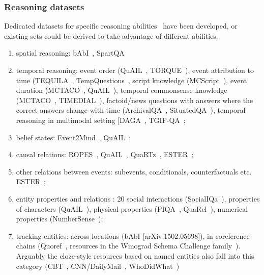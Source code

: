 \documentclass[acmsmall]{acmart}
\begin{document}
\subsubsection{Reasoning datasets}\label{reasoning_dataset}
Dedicated datasets for specific reasoning abilities~\citep{qiaoReasoningLanguageModel2022} have been developed, or existing sets could be derived to take advantage of different abilities.
\begin{enumerate}
    \item spatial reasoning: bAbI~\citep{westonAICompleteQuestionAnswering2015}, SpartQA~\citep{mirzaeeSPARTQATextualQuestion2021}
    \item temporal reasoning: event order (QuAIL~\citep{rogersGettingCloserAI2020}, TORQUE~\citep{ningTORQUEReadingComprehension2020}), 
event attribution to time (TEQUILA~\citep{jiaTEQUILATemporalQuestion2018}, TempQuestions~\citep{jiaTempQuestionsBenchmarkTemporal2018}, 
script knowledge (MCScript~\citep{ostermannMCScriptNovelDataset2018}), event duration (MCTACO~\citep{zhouGoingVacationTakes2019}, QuAIL~\citep{rogersGettingCloserAI2020}), 
temporal commonsense knowledge (MCTACO~\citep{zhouGoingVacationTakes2019}, TIMEDIAL~\citep{qinTIMEDIALTemporalCommonsense2021}), 
factoid/news questions with answers where the correct answers change with time (ArchivalQA~\citep{wangArchivalQALargescaleBenchmark2022}, SituatedQA~\citep{zhangSituatedQAIncorporatingExtraLinguistic2021}), temporal reasoning in multimodal setting [DAGA~\citep{fayekTemporalReasoningAudio2020}, TGIF-QA~\citep{jangTGIFQASpatioTemporalReasoning2017};
    \item belief states: Event2Mind~\citep{rashkinEvent2MindCommonsenseInference2018}, QuAIL~\citep{rogersGettingCloserAI2020};
    \item causal relations: ROPES~\citep{linReasoningParagraphEffects2019}, QuAIL~\citep{rogersGettingCloserAI2020}, QuaRTz~\citep{tafjordQuaRTzOpenDomainDataset2019}, ESTER~\citep{hanESTERMachineReading2021};
    \item other relations between events: subevents, conditionals, counterfactuals etc. ESTER~\citep{hanESTERMachineReading2021};
    \item entity properties and relations : 20 social interactions (SocialIQa~\citep{sapSocialIQaCommonsense2019}), properties of characters (QuAIL~\citep{rogersGettingCloserAI2020}), 
physical properties (PIQA~\citep{biskPIQAReasoningPhysical2020}, QuaRel~\citep{tafjordQuaRelDatasetModels2018}), numerical properties (NumberSense~\citep{linBirdsHaveFour2020}); 
    \item tracking entities: across locations (bAbI [arXiv:1502.05698]), in coreference chains (Quoref~\citep{dasigiQuorefReadingComprehension2019}, resources in the Winograd Schema Challenge family~\citep{sakaguchiWinoGrandeAdversarialWinograd2019}). 
Arguably the cloze-style resources based on named entities also fall into this category (CBT~\citep{hillGoldilocksPrincipleReading2016}, CNN/DailyMail~\citep{hermannTeachingMachinesRead2015}, WhoDidWhat~\citep{onishiWhoDidWhat2016})
\end{enumerate}
\end{document}
